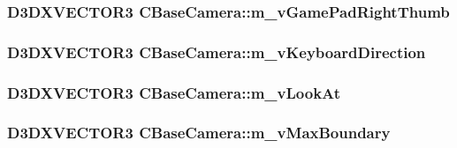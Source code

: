 \hypertarget{class_c_base_camera_a1b9e69b2140314515049b30091d9a788}{
\subsubsection[{m\_\-vGamePadRightThumb}]{\setlength{\rightskip}{0pt plus 5cm}D3DXVECTOR3 {\bf CBaseCamera::m\_\-vGamePadRightThumb}}}
\label{class_c_base_camera_a1b9e69b2140314515049b30091d9a788}
\hypertarget{class_c_base_camera_aed43d3466c7a2d60b7b62845ab602b6f}{
\subsubsection[{m\_\-vKeyboardDirection}]{\setlength{\rightskip}{0pt plus 5cm}D3DXVECTOR3 {\bf CBaseCamera::m\_\-vKeyboardDirection}}}
\label{class_c_base_camera_aed43d3466c7a2d60b7b62845ab602b6f}
\hypertarget{class_c_base_camera_a0c773d85e2ca0bf6eaf60e90478b6520}{
\subsubsection[{m\_\-vLookAt}]{\setlength{\rightskip}{0pt plus 5cm}D3DXVECTOR3 {\bf CBaseCamera::m\_\-vLookAt}}}
\label{class_c_base_camera_a0c773d85e2ca0bf6eaf60e90478b6520}
\hypertarget{class_c_base_camera_a8f823201300bc646e232a82a4c5b6eea}{
\subsubsection[{m\_\-vMaxBoundary}]{\setlength{\rightskip}{0pt plus 5cm}D3DXVECTOR3 {\bf CBaseCamera::m\_\-vMaxBoundary}}}
\label{class_c_base_camera_a8f823201300bc646e232a82a4c5b6eea}
